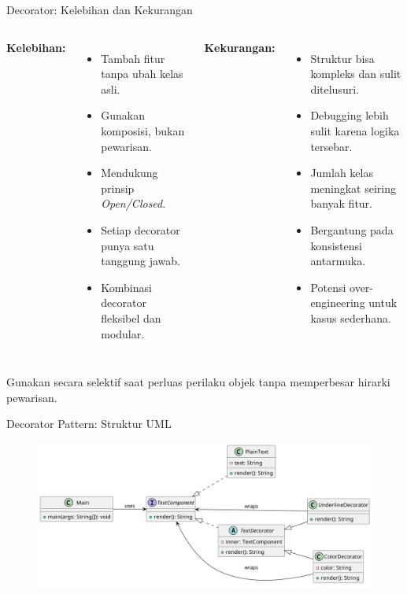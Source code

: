 \documentclass[aspectratio=169, table]{beamer}
\begin{document}
\begin{frame}[fragile]{Decorator: Kelebihan dan Kekurangan}
	\vspace{20pt}
	\begin{columns}[T]
		\textbf{Kelebihan:}
		\begin{itemize}
			\item Tambah fitur tanpa ubah kelas asli.
			\item Gunakan komposisi, bukan pewarisan.
			\item Mendukung prinsip \textit{Open/Closed}.
			\item Setiap decorator punya satu tanggung jawab.
			\item Kombinasi decorator fleksibel dan modular.
		\end{itemize}
		
		\textbf{Kekurangan:}
		\begin{itemize}
			\item Struktur bisa kompleks dan sulit ditelusuri.
			\item Debugging lebih sulit karena logika tersebar.
			\item Jumlah kelas meningkat seiring banyak fitur.
			\item Bergantung pada konsistensi antarmuka.
			\item Potensi over-engineering untuk kasus sederhana.
		\end{itemize}
	\end{columns}
	
	\vspace{5pt}
	Gunakan secara selektif saat perluas perilaku objek tanpa memperbesar hirarki pewarisan.
\end{frame}


\begin{frame}[fragile]{Decorator Pattern: Struktur UML}
	\vspace{20pt}
	\begin{figure}[h]
		\centering
		\includegraphics[width=\textwidth]{../../figures/out/decorator.png}
		\label{fig:decorator}
	\end{figure}
\end{frame}
\end{document}
